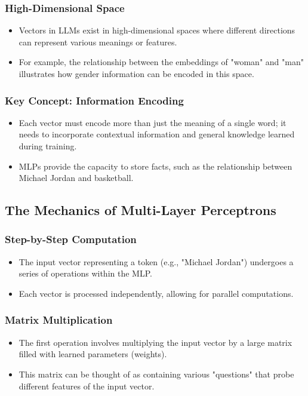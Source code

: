 \documentclass{article}
\begin{document}
\subsubsection*{High-Dimensional Space}
\begin{itemize}
\item Vectors in LLMs exist in high-dimensional spaces where different directions can represent various meanings or features.
\item For example, the relationship between the embeddings of "woman" and "man" illustrates how gender information can be encoded in this space.
\end{itemize}

\subsubsection*{Key Concept: Information Encoding}
\begin{itemize}
\item Each vector must encode more than just the meaning of a single word; it needs to incorporate contextual information and general knowledge learned during training.
\item MLPs provide the capacity to store facts, such as the relationship between Michael Jordan and basketball.
\end{itemize}

\subsection*{The Mechanics of Multi-Layer Perceptrons}
\subsubsection*{Step-by-Step Computation}
\begin{itemize}
\item The input vector representing a token (e.g., "Michael Jordan") undergoes a series of operations within the MLP.
\item Each vector is processed independently, allowing for parallel computations.
\end{itemize}

\subsubsection*{Matrix Multiplication}
\begin{itemize}
\item The first operation involves multiplying the input vector by a large matrix filled with learned parameters (weights).
\item This matrix can be thought of as containing various "questions" that probe different features of the input vector.
\end{itemize}
\end{document}
